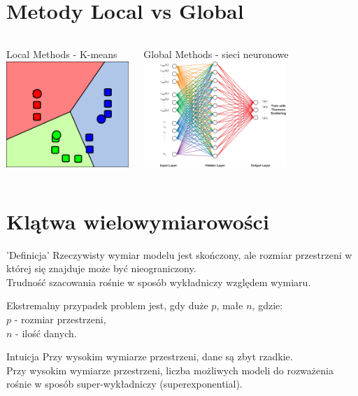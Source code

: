 \documentclass[a4paper]{beamer}
\begin{document}
\section{Metody Local vs Global}
\begin{frame}
\begin{columns}
\begin{block}{Local Methods}
- K-means \\[0.2cm]
\includegraphics[height=4cm]{kmeans.png}
\end{block}
\begin{block}{Global Methods}
- sieci neuronowe \\[0.2cm]
\includegraphics[height=4cm]{neuralnetwork.png}
\end{block}
\end{columns}
\end{frame}

\section{Klątwa wielowymiarowości}
\begin{frame}
\begin{block}{'Definicja'}
Rzeczywisty wymiar modelu jest skończony, ale rozmiar przestrzeni w której się znajduje może być nieograniczony. \\
Trudność szacowania rośnie w sposób wykładniczy względem wymiaru.
\end{block}
Ekstremalny przypadek problem jest, gdy duże $p$, małe $n$, gdzie: \\ 
$p$ - rozmiar przestrzeni, \\
$n$ - ilość danych.
\pause
\begin{block}{Intuicja}
Przy wysokim wymiarze przestrzeni, dane są zbyt rzadkie. \\
Przy wysokim wymiarze przestrzeni, liczba możliwych modeli do rozważenia rośnie w sposób super-wykładniczy (superexponential).

\end{block}
\end{frame}
\end{document}
